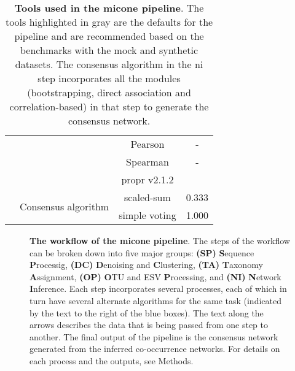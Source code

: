 \begin{table}[H]
\begin{tabular}{|c|c|c|c|}
                                          & & Pearson & - \\
                                          & & Spearman & - \\
                                          & & propr v2.1.2 & \cite{quinnProprRpackageIdentifying2017} \\ \cline{2-4}
                                          & \multirow{2}{*}{Consensus algorithm} & \rowcolor{lightgray} scaled-sum & 0.333 \\
                                          & & simple voting & 1.000 \\
      \hline
    \end{tabular}
    \caption{
      \textbf{Tools used in the \ac{micone} pipeline}.
      The tools highlighted in gray are the defaults for the pipeline and are recommended based on the benchmarks with the mock and synthetic datasets.
      The consensus algorithm in the \ac{ni} step incorporates all the modules (bootstrapping, direct association and correlation-based) in that step to generate the consensus network.
    }
    \label{tab:micone_tools}
  \end{table}


  \begin{figure}[H]
    \centering
    \caption{
      \textbf{The workflow of the \ac{micone} pipeline}.
      The steps of the workflow can be broken down into five major groups: \textbf{(SP)} \textbf{S}equence \textbf{P}rocessig, \textbf{(DC)} \textbf{D}enoising and \textbf{C}lustering, \textbf{(TA)} \textbf{T}axonomy \textbf{A}ssignment, \textbf{(OP)} \textbf{O}TU and ESV \textbf{P}rocessing, and \textbf{(NI)} \textbf{N}etwork \textbf{I}nference.
      Each step incorporates several processes, each of which in turn have several alternate algorithms for the same task (indicated by the text to the right of the blue boxes).
      The text along the arrows describes the data that is being passed from one step to another.
      The final output of the pipeline is the consensus network generated from the inferred co-occurrence networks.
      For details on each process and the outputs, see Methods.
    }
    \label{fig:figure1}
  \end{figure}



